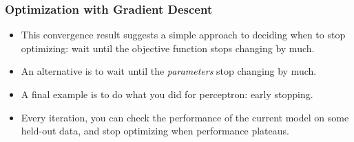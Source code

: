 \documentclass[trans,aspectratio=169]{beamer}
\begin{document}

\begin{frame}
  \frametitle{Optimization with Gradient Descent}
\begin{itemize}
\item
This convergence result suggests a simple approach to deciding when to
stop optimizing: wait until the objective function stops changing by
much.  
\item An alternative is to wait until the \emph{parameters} stop
changing by much. 
\item A final example is to do what you did for
perceptron: early stopping.  
\item Every iteration, you can check the
performance of the current model on some held-out data, and stop
optimizing when performance plateaus.
\end{itemize}
\end{frame}
\end{document}
